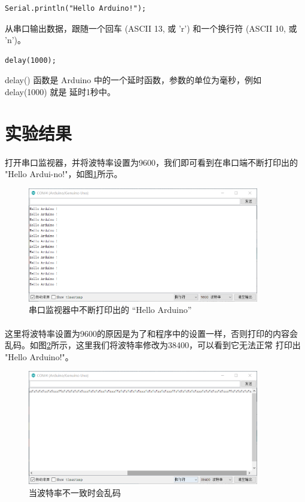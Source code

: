 \documentclass[UTF8, oneside]{ctexbook}
\begin{document}
\begin{lstlisting}[style=CPP]
Serial.println("Hello Arduino!");
\end{lstlisting}
从串口输出数据，跟随一个回车 (ASCII 13, 或 'r') 和一个换行符 (ASCII 10, 或 'n')。

\begin{lstlisting}[style=CPP]
delay(1000);
\end{lstlisting}
delay() 函数是 Arduino 中的一个延时函数，参数的单位为毫秒，例如 delay(1000) 就是
延时1秒中。

\section{实验结果}
\paragraph{}
打开串口监视器，并将波特率设置为9600，我们即可看到在串口端不断打印出的 
"Hello Ardui-\newline no!"，如图\ref{b1_1}所示。
\begin{figure}[h]
    \centering
    \includegraphics[width=0.9\textwidth]{./result/basic/1/1_1.png}
    \caption{串口监视器中不断打印出的 “Hello Arduino”}
    \label{b1_1}
\end{figure}

\paragraph{}
这里将波特率设置为9600的原因是为了和程序中的设置一样，否则打印的内容会
乱码。如图\ref{b1_2}所示，这里我们将波特率修改为38400，可以看到它无法正常
打印出 "Hello Arduino!"。
\begin{figure}[h]
    \centering
    \includegraphics[width=0.9\textwidth]{./result/basic/1/1_2.png}
    \caption{当波特率不一致时会乱码}
    \label{b1_2}
\end{figure}
\end{document}
